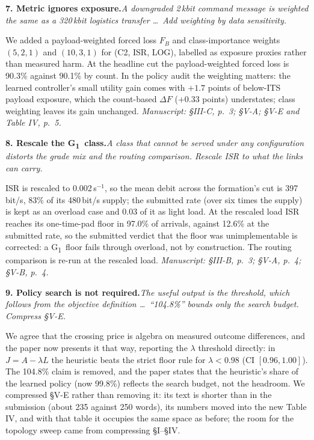\documentclass[10pt,a4paper]{article}
\newcommand{\loc}[1]{\textit{Manuscript: #1.}}
\newcommand{\GI}{G\textsubscript{1}}
\newcommand{\comment}[2]{\par\medskip\noindent\textbf{#1}\hspace{0.4em}\textit{#2}\par}
\begin{document}
\comment{7. Metric ignores exposure.}{A downgraded 2\,kbit command message is weighted the same as a 320\,kbit logistics transfer \ldots\ Add weighting by data sensitivity.}
We added a payload-weighted forced loss $F_B$ and class-importance weights $(5,2,1)$
and $(10,3,1)$ for (C2, ISR, LOG), labelled as exposure proxies rather than measured
harm. At the headline cut the payload-weighted forced loss is 90.3\% against 90.1\%
by count. In the policy audit the weighting matters: the learned controller's small
utility gain comes with $+1.7$ points of below-ITS payload exposure, which the
count-based $\Delta F$ ($+0.33$ points) understates; class weighting leaves its gain
unchanged.
\loc{\S III-C, p.~3; \S V-A; \S V-E and Table IV, p.~5}

\comment{8. Rescale the \GI\ class.}{A class that cannot be served under any configuration distorts the grade mix and the routing comparison. Rescale ISR to what the links can carry.}
ISR is rescaled to 0.002\,s$^{-1}$, so the mean debit across the formation's cut is
397\,bit/s, 83\% of its 480\,bit/s supply; the submitted rate (over six times the
supply) is kept as an overload case and 0.03 of it as light load. At the rescaled load
ISR reaches its one-time-pad floor in 97.0\% of arrivals, against 12.6\% at the
submitted rate, so the submitted verdict that the floor was unimplementable is
corrected: a \GI\ floor fails through overload, not by construction. The routing
comparison is re-run at the rescaled load.
\loc{\S III-B, p.~3; \S V-A, p.~4; \S V-B, p.~4}

\comment{9. Policy search is not required.}{The useful output is the threshold, which follows from the objective definition \ldots\ ``104.8\%'' bounds only the search budget. Compress \S V-E.}
We agree that the crossing price is algebra on measured outcome differences, and the
paper now presents it that way, reporting the $\lambda$ threshold directly: in
$J=A-\lambda L$ the heuristic beats the strict floor rule for $\lambda<0.98$ (CI
$[0.96,1.00]$). The 104.8\% claim is removed, and the paper states that the
heuristic's share of the learned policy (now 99.8\%) reflects the search budget, not
the headroom. We compressed \S V-E rather than removing it: its text is shorter than
in the submission (about 235 against 250 words), its numbers moved into the new
Table IV, and with that table it occupies the same space as before; the room for the
topology sweep came from compressing \S I--\S IV.
\end{document}
